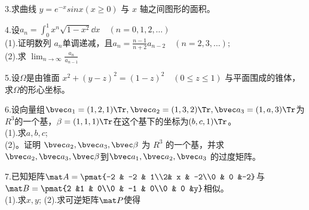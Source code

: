 3.求曲线 $y=e^{-x}sinx(x\geqslant 0)$ 与 $x$ 轴之间图形的面积。

4.设$a_n=\int_0^1 x^n \sqrt{1-x^2}\dd{x}\quad (n=0,1,2,\dots)$\\
(1).证明数列 ${a_n}$单调递减，且$\displaystyle a_n=\frac{n-1}{n+2}a_{n-2}\quad (n=2,3,\dots);$\\
(2).求 $\displaystyle \lim_{n \to \infty}\frac{a_n}{a_{n-1}}$

5.设$\Omega$是由锥面 $x^2+(y-z)^2=(1-z)^2 \quad (0\leqslant z \leqslant 1)$ 与平面围成的锥体，求$\Omega$的形心坐标。

6.设向量组$\bvec a_1=(1,2,1) \Tr,\bvec a_2=(1,3,2) \Tr,\bvec a_3=(1,a,3) \Tr$为$R^3$的一个基，$\beta=(1,1,1)\Tr$在这个基下的坐标为$(b,c,1) \Tr$。\\
(1).求$a,b,c$;\\
(2)。证明 $\bvec a_2,\bvec a_3,\bvec \beta$ 为 $R^3$ 的一个基，并求 $\bvec a_2,\bvec a_3,\bvec \beta$到$\bvec a_1,\bvec a_2,\bvec a_3$ 的过度矩阵。

7.已知矩阵$\mat A=\pmat{-2 & -2 & 1\\2& x & -2\\0 & 0 &-2}$与$\mat B=\pmat{2 &1 & 0\\0 & -1 & 0\\0 & 0 &y}$相似。\\
(1).求$x,y$;
(2).求可逆矩阵$\mat P$使得